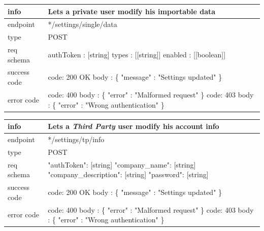 \documentclass[titlepage]{article}
\begin{document}
\vspace{\baselineskip}

\begin{tabularx}{\textwidth}{lX} \hline
    info & Lets a private user modify his importable data \\ \hline
    endpoint & */settings/single/data \\ \hline
    type & POST \\ \hline
    req schema & 
        authToken : [string] \newline
        types : [[string]] \newline
        enabled : [[boolean]] \\ \hline
    success code &
        code: 200 OK \newline  
        body : \{ \newline
        "message" : "Settings updated" \newline
        \} \\ \hline
    error code &
        code: 400 \newline
        body : \{ "error" : "Malformed request" \} \newline \newline
        code: 403 \newline
        body : \{ "error" : "Wrong authentication" \}\\  \hline
\end{tabularx}
		
\vspace{\baselineskip}

\begin{tabularx}{\textwidth}{lX} \hline
    info & Lets a {\it Third Party} user modify his account info \\ \hline
    endpoint & */settings/tp/info \\ \hline
    type & POST \\ \hline
    req schema & 
    "authToken": [string] \newline
    "company\_name": [string] \newline
    "company\_description": [string] \newline
    "password": [string] \\ \hline
    success code &
        code: 200 OK \newline  
        body : \{ \newline
        "message" : "Settings updated" \newline
        \} \\ \hline
    error code &
        code: 400 \newline
        body : \{ "error" : "Malformed request" \} \newline \newline
        code: 403 \newline
        body : \{ "error" : "Wrong authentication" \} \\ \hline
\end{tabularx}
		
\end{document}
